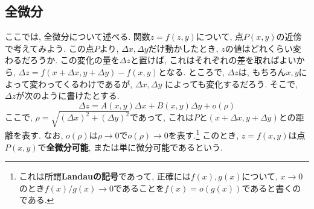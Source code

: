 \documentclass[a4j,dvipdfmx]{jsarticle}
\numberwithin{equation}{section}
\begin{document}
        \subsection{全微分}
            ここでは, 全微分について述べる. 関数$z=f(z,y)$について, 点$P(x,y)$の近傍で考えてみよう. この点$P$より, $\Delta x,\Delta y$だけ動かしたとき, $z$の値はどれくらい変わるだろうか.
            この変化の量を$\Delta z$と置けば, これはそれぞれの差を取ればよいから, $\Delta z=f(x+\Delta x,y+\Delta y)-f(x,y)$となる. ところで, $\Delta z$は, もちろん$x,y$によって変わってくるわけであるが, $\Delta x,\Delta y$
            によっても変化するだろう. そこで, $\Delta z$が次のように書けたとする.
            \begin{equation}
                \Delta z = A(x,y)\Delta x+B(x,y)\Delta y+o(\rho) \label{eq:偏微分:Δzの式}
            \end{equation}
            ここで, $\rho = \sqrt{(\Delta x)^2+(\Delta y)^2}$であって, これは$P$と$(x+\Delta x,y+\Delta y)$との距離を表す.
            なお, $o(\rho)$は$\rho\to 0$で$o(\rho)\to 0$を表す.\footnote{これは所謂\textbf{Landauの記号}であって, 正確には$f(x),g(x)$について, $x\to 0$のとき$f(x)/g(x)\to 0$であることを$f(x)=o(g(x))$であると書くのである.}
            このとき, $z=f(x,y)$は点$P(x,y)$で\textbf{全微分可能}, または単に微分可能であるという.
\end{document}
